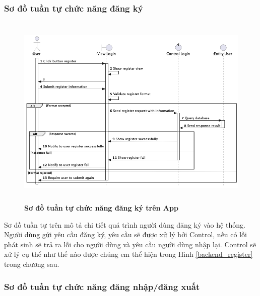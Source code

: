 \subsubsection{Sơ đồ tuần tự chức năng đăng ký}
  \begin{figure}[H]
        \centering
        \includegraphics[width=12.9cm,height=9.4cm]{Images/mobile_app/register.png}
        \caption[Sơ đồ tuần tự chức năng đăng ký trên App]{\bfseries \fontsize{12pt}{0pt}
        \selectfont Sơ đồ tuần tự chức năng đăng ký trên App}
        \label{register} %
  \end{figure}
  Sơ đồ tuần tự trên mô tả chi tiết quá trình người dùng đăng ký vào hệ thống. Người dùng gửi yêu cầu đăng ký, yêu cầu sẽ
  được xử lý bởi Control, nếu có lỗi phát sinh sẽ trả ra lỗi cho người dùng và yêu cầu người dùng nhập lại. Control
  sẽ xử lý cụ thể như thế nào được chúng em thể hiện trong Hình \ref{backend_register} trong chương sau.
\subsubsection{Sơ đồ tuần tự chức năng đăng nhập/đăng xuất}

